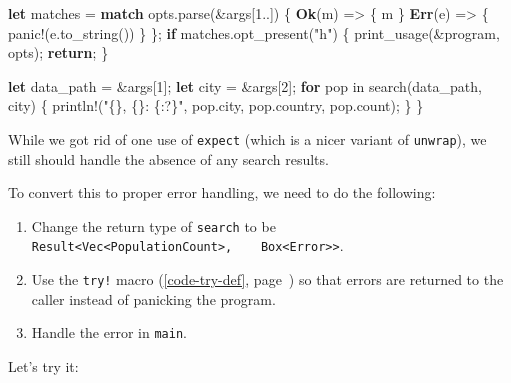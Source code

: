 \documentclass[a4paper,]{book}
\renewcommand*{\hyperref}[2][\ar]{%
  \def\ar{#2}%
  #2 (\autoref{#1}, page~\pageref{#1})}
\newenvironment{Shaded}{\begin{snugshade}}{\end{snugshade}}
\newcommand{\KeywordTok}[1]{\textcolor[rgb]{0.13,0.29,0.53}{\textbf{{#1}}}}
\newcommand{\DecValTok}[1]{\textcolor[rgb]{0.00,0.00,0.81}{{#1}}}
\newcommand{\StringTok}[1]{\textcolor[rgb]{0.31,0.60,0.02}{{#1}}}
\newcommand{\OtherTok}[1]{\textcolor[rgb]{0.56,0.35,0.01}{{#1}}}
\newcommand{\NormalTok}[1]{{#1}}
\begin{document}
\begin{Shaded}
\begin{Highlighting}[]
    \KeywordTok{let} \NormalTok{matches = }\KeywordTok{match} \NormalTok{opts.parse(&args[}\DecValTok{1.}\NormalTok{.]) \{}
        \KeywordTok{Ok}\NormalTok{(m)  => \{ m \}}
        \KeywordTok{Err}\NormalTok{(e) => \{ }\OtherTok{panic!}\NormalTok{(e.to_string()) \}}
    \NormalTok{\};}
    \KeywordTok{if} \NormalTok{matches.opt_present(}\StringTok{"h"}\NormalTok{) \{}
        \NormalTok{print_usage(&program, opts);}
        \KeywordTok{return}\NormalTok{;}
    \NormalTok{\}}

    \KeywordTok{let} \NormalTok{data_path = &args[}\DecValTok{1}\NormalTok{];}
    \KeywordTok{let} \NormalTok{city = &args[}\DecValTok{2}\NormalTok{];}
    \KeywordTok{for} \NormalTok{pop in search(data_path, city) \{}
        \OtherTok{println!}\NormalTok{(}\StringTok{"\{\}, \{\}: \{:?\}"}\NormalTok{, pop.city, pop.country, pop.count);}
    \NormalTok{\}}
\NormalTok{\}}
\end{Highlighting}
\end{Shaded}

While we got rid of one use of \texttt{expect} (which is a nicer variant
of \texttt{unwrap}), we still should handle the absence of any search
results.

To convert this to proper error handling, we need to do the following:

\begin{enumerate}
\def\labelenumi{\arabic{enumi}.}
\itemsep1pt\parskip0pt
\item
  Change the return type of \texttt{search} to be
  \texttt{Result\textless{}Vec\textless{}PopulationCount\textgreater{},\ \ \ \ Box\textless{}Error\textgreater{}\textgreater{}}.
\item
  Use the \hyperref[code-try-def]{\texttt{try!} macro} so that errors
  are returned to the caller instead of panicking the program.
\item
  Handle the error in \texttt{main}.
\end{enumerate}

Let's try it:
\end{document}
